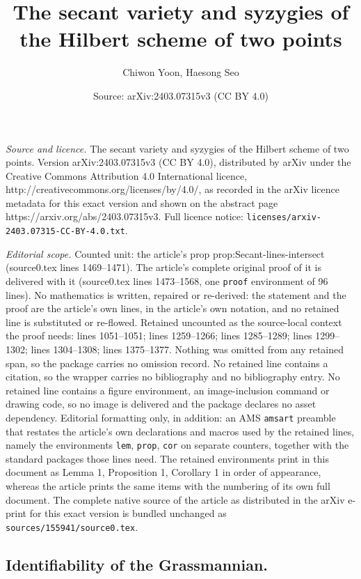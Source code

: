 \documentclass[10pt,a4paper]{amsart}
\title{The secant variety and syzygies of the Hilbert scheme of two points}
\author{Chiwon Yoon, Haesong Seo}
\date{Source: arXiv:2403.07315v3 (CC BY 4.0)}
\begin{document}
\maketitle

\noindent\emph{Source and licence.} The secant variety and syzygies of the Hilbert scheme of two points. Version arXiv:2403.07315v3 (CC BY 4.0), distributed by arXiv under the Creative Commons Attribution 4.0 International licence, http://creativecommons.org/licenses/by/4.0/, as recorded in the arXiv licence metadata for this exact version and shown on the abstract page https://arxiv.org/abs/2403.07315v3. Full licence notice: \texttt{licenses/arxiv-2403.07315-CC-BY-4.0.txt}.\par\smallskip

\noindent\textit{Editorial scope.} Counted unit: the article's prop prop:Secant-lines-intersect (source0.tex lines 1469--1471). The article's complete original proof of it is delivered with it (source0.tex lines 1473--1568, one \texttt{proof} environment of 96 lines). No mathematics is written, repaired or re-derived: the statement and the proof are the article's own lines, in the article's own notation, and no retained line is substituted or re-flowed.  Retained uncounted as the source-local context the proof needs: lines 1051--1051; lines 1259--1266; lines 1285--1289; lines 1299--1302; lines 1304--1308; lines 1375--1377.  Nothing was omitted from any retained span, so the package carries no omission record.  No retained line contains a citation, so the wrapper carries no bibliography and no bibliography entry.  No retained line contains a figure environment, an image-inclusion command or drawing code, so no image is delivered and the package declares no asset dependency.  Editorial formatting only, in addition: an AMS \texttt{amsart} preamble that restates the article's own declarations and macros used by the retained lines, namely the environments \texttt{lem}, \texttt{prop}, \texttt{cor} on separate counters, together with the standard packages those lines need.  The retained environments print in this document as Lemma 1, Proposition 1, Corollary 1 in order of appearance, whereas the article prints the same items with the numbering of its own full document.  The complete native source of the article as distributed in the arXiv e-print for this exact version is bundled unchanged as \texttt{sources/155941/source0.tex}.
\subsection{Identifiability of the Grassmannian.} \label{subsec:identifiability-of-grassmannians}
\end{document}
